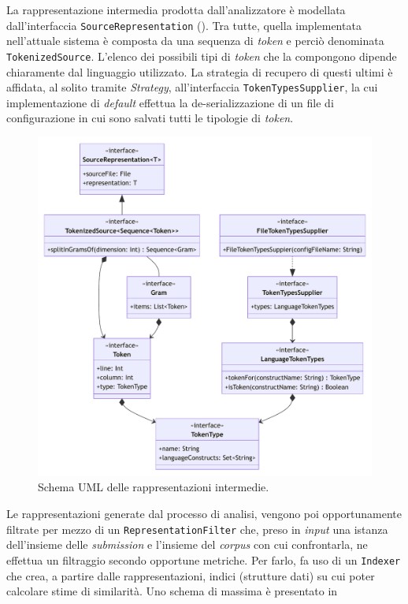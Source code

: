 La rappresentazione intermedia prodotta dall'analizzatore è modellata dall'interfaccia \texttt{SourceRepresentation} (). 
%
Tra tutte, quella implementata nell'attuale sistema è composta da una sequenza di \textit{token} e perciò denominata \texttt{TokenizedSource}.
%
L'elenco dei possibili tipi di \textit{token} che la compongono dipende chiaramente dal linguaggio utilizzato.
%
La strategia di recupero di questi ultimi è affidata, al solito tramite \textit{Strategy}, all'interfaccia \texttt{TokenTypesSupplier}, la cui implementazione di \textit{default} effettua la de-serializzazione di un file di configurazione in cui sono salvati tutti le tipologie di \textit{token}.

\begin{figure}[h!]
    \centering
    \includegraphics[width=\textwidth]{resources/img/02-representations.pdf}
    \caption{Schema UML delle rappresentazioni intermedie.}
    \label{img:02-representations}
\end{figure}

Le rappresentazioni generate dal processo di analisi, vengono poi opportunamente filtrate per mezzo di un \texttt{RepresentationFilter} che, preso in \textit{input} una istanza dell'insieme delle \textit{submission} e l'insieme del \textit{corpus} con cui confrontarla, ne effettua un filtraggio secondo opportune metriche.
%
Per farlo, fa uso di un \texttt{Indexer} che crea, a partire dalle rappresentazioni, indici (strutture dati) su cui poter calcolare stime di similarità.
%
Uno schema di massima è presentato in 


